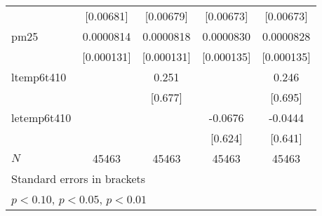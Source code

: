 {\begin{tabular}{l*{4}{c}}
            &   [0.00681]         &   [0.00679]         &   [0.00673]         &   [0.00673]         \\
[1em]
pm25        &   0.0000814         &   0.0000818         &   0.0000830         &   0.0000828         \\
            &  [0.000131]         &  [0.000131]         &  [0.000135]         &  [0.000135]         \\
[1em]
ltemp6t410  &                     &       0.251         &                     &       0.246         \\
            &                     &     [0.677]         &                     &     [0.695]         \\
[1em]
letemp6t410 &                     &                     &     -0.0676         &     -0.0444         \\
            &                     &                     &     [0.624]         &     [0.641]         \\
\hline
\(N\)       &       45463         &       45463         &       45463         &       45463         \\
\hline\hline
\multicolumn{5}{l}{\footnotesize Standard errors in brackets}\\
\multicolumn{5}{l}{\footnotesize \sym{*} \(p<0.10\), \sym{**} \(p<0.05\), \sym{***} \(p<0.01\)}\\
\end{tabular}
}
